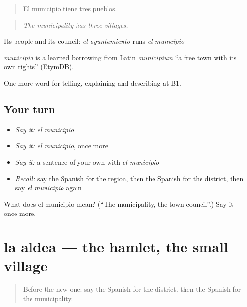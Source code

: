 \begin{quote}
El municipio tiene tres pueblos.
\end{quote}

\begin{quote}
\emph{The municipality has three villages.}
\end{quote}

Its people and its council: \emph{el ayuntamiento} runs \emph{el municipio}.

\begin{cousinweb}
\emph{municipio} is a learned borrowing from Latin \emph{mūnicipium} \textquotedblleft{}a free town with its own rights\textquotedblright{} (EtymDB).
\end{cousinweb}

\begin{grammarlens}[title={What you've built}]
One more word for telling, explaining and describing at B1.
\end{grammarlens}

\subsection*{Your turn}
\begin{itemize}
\raggedright
  \item \emph{Say it:} \emph{el municipio}
  \item \emph{Say it:} \emph{el municipio}, once more
  \item \emph{Say it:} a sentence of your own with \emph{el municipio}
  \item \emph{Recall:} say the Spanish for the region, then the Spanish for the district, then say \emph{el municipio} again
\end{itemize}

\begin{tcolorbox}[breakable,colback=teal!4,colframe=teal!35!black,title={Before you move on}]
What does el municipio mean? (\textquotedblleft{}The municipality, the town council\textquotedblright{}.) Say it once more.
\end{tcolorbox}
\section[la aldea]{la aldea — the hamlet, the small village}

\label{lesson:ES-C683-aldea}



\begin{quote}
Before the new one: say the Spanish for the district, then the Spanish for the municipality.
\end{quote}

